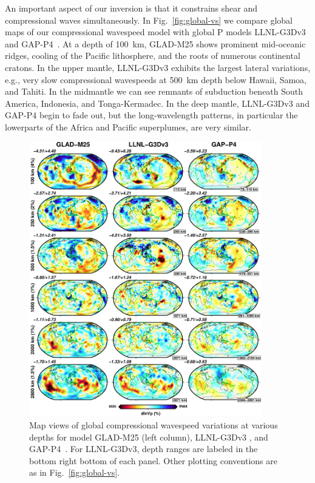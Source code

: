 \documentclass[extra,mreferee]{gji}
\begin{document}
An important aspect of our inversion is that it constrains shear and
compressional waves simultaneously. In Fig.~\ref{fig:global-vs} we
compare global maps of our compressional wavespeed model with global P models
LLNL-G3Dv3~\citep{simmons2012llnl} and GAP-P4~\citep{fukao2013subducted}.
At a depth of 100~km,
GLAD-M25 shows prominent mid-oceanic ridges, cooling of the Pacific lithosphere,
and the roots of numerous continental cratons. In the upper mantle, LLNL-G3Dv3
exhibits the largest lateral variations,
e.g., very slow compressional wavespeeds at 500~km depth below Hawaii, Samoa, and Tahiti.
In the midmantle we can see remnants of subduction beneath South America, Indonesia,
and Tonga-Kermadec.
In the deep mantle, LLNL-G3Dv3 and GAP-P4 begin to fade out, but the long-wavelength patterns,
in particular the lowerparts of the Africa and Pacific superplumes, are very similar.


\begin{figure}
\includegraphics[width=0.9\textwidth]{figures/depth_slice/globe_vp_LLNL-GAP.pdf}
  \caption{Map views of global compressional wavespeed variations at various depths for model
  GLAD-M25 (left column), LLNL-G3Dv3 \citep[middle column;][]{simmons2012llnl}, and
  GAP-P4~\citep[right column;][]{fukao2013subducted}.
  For LLNL-G3Dv3, depth ranges are labeled in the bottom right
  bottom of each panel. Other plotting conventions are as in Fig.~\ref{fig:global-vs}.}
\label{fig:global-vp}
\centering
\end{figure}
\end{document}

